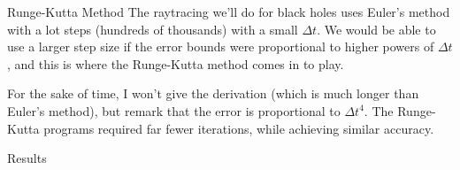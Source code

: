 \documentclass{beamer}
\begin{document}
    \begin{frame}{Runge-Kutta Method}
        The raytracing we'll do for black holes uses Euler's method with a
        lot steps (hundreds of thousands) with a small $\Delta{t}$. We would be
        able to use a larger step size if the error bounds were proportional to
        higher powers of $\Delta{t}$, and this is where the Runge-Kutta method
        comes in to play.
        \par\hfill\par
        For the sake of time, I won't give the derivation (which is much
        longer than Euler's method), but remark that the error is
        proportional to $\Delta{t}^{4}$. The Runge-Kutta programs required
        far fewer iterations, while achieving similar accuracy.
    \end{frame}
    \begin{frame}{Results}
        \begin{figure}
            \centering
        \end{figure}
    \end{frame}
\end{document}
